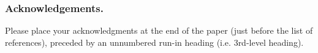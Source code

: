 \documentclass[runningheads]{llncs}
\begin{document}
\subsubsection*{Acknowledgements.}
Please place your acknowledgments at the end of the paper (just before the
list of references), preceded by an unnumbered run-in heading (i.e. 3rd-level 
heading).
%
%
%
%


%
% 




%
\end{document}

